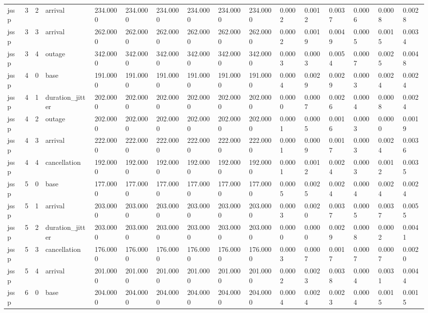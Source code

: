 \begin{table}[t]
\begin{tabular}{llllllllllllllll}
jssp & 3 & 2 & arrival & 234.0000 & 234.0000 & 234.0000 & 234.0000 & 234.0000 & 234.0000 & 0.0002 & 0.0012 & 0.0037 & 0.0006 & 0.0008 & 0.0028 \\
jssp & 3 & 3 & arrival & 262.0000 & 262.0000 & 262.0000 & 262.0000 & 262.0000 & 262.0000 & 0.0002 & 0.0019 & 0.0049 & 0.0005 & 0.0015 & 0.0034 \\
jssp & 3 & 4 & outage & 342.0000 & 342.0000 & 342.0000 & 342.0000 & 342.0000 & 342.0000 & 0.0003 & 0.0003 & 0.0054 & 0.0007 & 0.0025 & 0.0048 \\
jssp & 4 & 0 & base & 191.0000 & 191.0000 & 191.0000 & 191.0000 & 191.0000 & 191.0000 & 0.0004 & 0.0029 & 0.0029 & 0.0003 & 0.0024 & 0.0024 \\
jssp & 4 & 1 & duration\_jitter & 202.0000 & 202.0000 & 202.0000 & 202.0000 & 202.0000 & 202.0000 & 0.0000 & 0.0007 & 0.0026 & 0.0004 & 0.0008 & 0.0024 \\
jssp & 4 & 2 & outage & 202.0000 & 202.0000 & 202.0000 & 202.0000 & 202.0000 & 202.0000 & 0.0001 & 0.0005 & 0.0016 & 0.0003 & 0.0000 & 0.0019 \\
jssp & 4 & 3 & arrival & 222.0000 & 222.0000 & 222.0000 & 222.0000 & 222.0000 & 222.0000 & 0.0001 & 0.0009 & 0.0017 & 0.0003 & 0.0024 & 0.0036 \\
jssp & 4 & 4 & cancellation & 192.0000 & 192.0000 & 192.0000 & 192.0000 & 192.0000 & 192.0000 & 0.0001 & 0.0012 & 0.0024 & 0.0003 & 0.0012 & 0.0035 \\
jssp & 5 & 0 & base & 177.0000 & 177.0000 & 177.0000 & 177.0000 & 177.0000 & 177.0000 & 0.0005 & 0.0025 & 0.0024 & 0.0004 & 0.0024 & 0.0024 \\
jssp & 5 & 1 & arrival & 203.0000 & 203.0000 & 203.0000 & 203.0000 & 203.0000 & 203.0000 & 0.0003 & 0.0020 & 0.0037 & 0.0005 & 0.0037 & 0.0055 \\
jssp & 5 & 2 & duration\_jitter & 203.0000 & 203.0000 & 203.0000 & 203.0000 & 203.0000 & 203.0000 & 0.0000 & 0.0000 & 0.0029 & 0.0008 & 0.0002 & 0.0041 \\
jssp & 5 & 3 & cancellation & 176.0000 & 176.0000 & 176.0000 & 176.0000 & 176.0000 & 176.0000 & 0.0003 & 0.0007 & 0.0017 & 0.0007 & 0.0007 & 0.0020 \\
jssp & 5 & 4 & arrival & 201.0000 & 201.0000 & 201.0000 & 201.0000 & 201.0000 & 201.0000 & 0.0002 & 0.0023 & 0.0038 & 0.0004 & 0.0031 & 0.0044 \\
jssp & 6 & 0 & base & 204.0000 & 204.0000 & 204.0000 & 204.0000 & 204.0000 & 204.0000 & 0.0004 & 0.0024 & 0.0023 & 0.0004 & 0.0015 & 0.0015 \\

\end{tabular}
\end{table}
